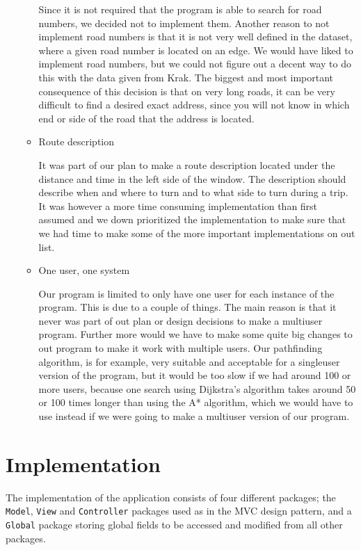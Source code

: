 \documentclass[a4paper,11pt]{article}
\begin{document}
\begin{itemize}
\begin{itemize}
		    Since it is not required that the program is able to search for road numbers, we decided not to implement them. Another reason to not implement road numbers is that it is not very well defined in the dataset, where a given road number is located on an edge. We would have liked to implement road numbers, but we could not figure out a decent way to do this with the data given from Krak. The biggest and most important consequence of this decision is that on very long roads, it can be very difficult to find a desired exact address, since you will not know in which end or side of the road that the address is located.   

		\item Route description

		    It was part of our plan to make a route description located under the distance and time in the left side of the window. The description should describe when and where to turn and to what side to turn during a trip. It was however a more time consuming implementation than first assumed and we down prioritized the implementation to make sure that we had time to make some of the more important implementations on out list. 

		\item One user, one system

		    Our program is limited to only have one user for each instance of the program. This is due to a couple of things. The main reason is that it never was part of out plan or design decisions to make a multiuser program. Further more would we have to make some quite big changes to out program to make it work with multiple users. Our pathfinding algorithm, is for example, very suitable and acceptable for a singleuser version of the program, but it would be too slow if we had around 100 or more users, because one search using Dijkstra's algorithm takes around 50 or 100 times longer than using the A* algorithm, which we would have to use instead if we were going to make a multiuser version of our program.
	\end{itemize}
\end{itemize}

\pagebreak
\section{Implementation}
\label{sec:Implementation}
The implementation of the application consists of four different packages; the \texttt{Model}, \texttt{View} and \texttt{Controller} packages used as in the MVC design pattern, and a \texttt{Global} package storing global fields to be accessed and modified from all other packages.
\end{document}
